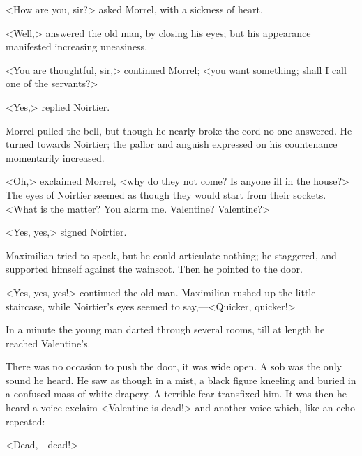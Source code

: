  <How are you, sir?> asked Morrel, with a sickness of heart. 

 <Well,> answered the old man, by closing his eyes; but his appearance manifested increasing uneasiness. 

 <You are thoughtful, sir,> continued Morrel; <you want something; shall I call one of the servants?> 

 <Yes,> replied Noirtier. 

 Morrel pulled the bell, but though he nearly broke the cord no one answered. He turned towards Noirtier; the pallor and anguish expressed on his countenance momentarily increased. 

 <Oh,> exclaimed Morrel, <why do they not come? Is anyone ill in the house?> The eyes of Noirtier seemed as though they would start from their sockets. <What is the matter? You alarm me. Valentine? Valentine?> 

 <Yes, yes,> signed Noirtier. 

 Maximilian tried to speak, but he could articulate nothing; he staggered, and supported himself against the wainscot. Then he pointed to the door. 

 <Yes, yes, yes!> continued the old man.  Maximilian rushed up the little staircase, while Noirtier's eyes seemed to say,—<Quicker, quicker!> 

 In a minute the young man darted through several rooms, till at length he reached Valentine's. 

 There was no occasion to push the door, it was wide open. A sob was the only sound he heard. He saw as though in a mist, a black figure kneeling and buried in a confused mass of white drapery. A terrible fear transfixed him. It was then he heard a voice exclaim <Valentine is dead!> and another voice which, like an echo repeated: 

 <Dead,—dead!>  